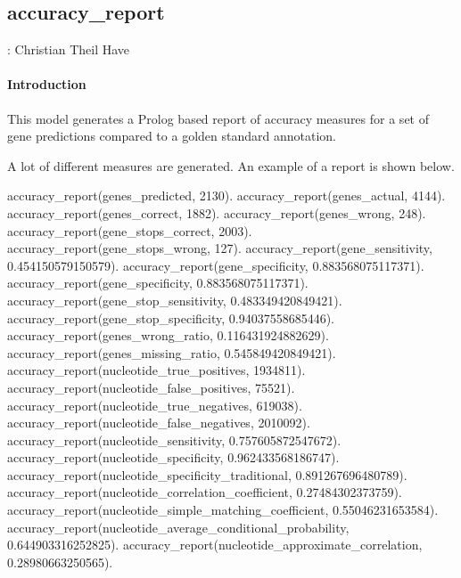 


\subsection{accuracy_report}

\label{sec:accuracyreport}

\begin{tags}
: Christian Theil Have
\end{tags}

\paragraph{Introduction}

This model generates a Prolog based report of accuracy measures
for a set of gene predictions compared to a golden standard annotation.

A lot of different measures are generated. An example of a report is
shown below.

\begin{code}
accuracy_report(genes_predicted, 2130).
accuracy_report(genes_actual, 4144).
accuracy_report(genes_correct, 1882).
accuracy_report(genes_wrong, 248).
accuracy_report(gene_stops_correct, 2003).
accuracy_report(gene_stops_wrong, 127).
accuracy_report(gene_sensitivity, 0.454150579150579).
accuracy_report(gene_specificity, 0.883568075117371).
accuracy_report(gene_specificity, 0.883568075117371).
accuracy_report(gene_stop_sensitivity, 0.483349420849421).
accuracy_report(gene_stop_specificity, 0.94037558685446).
accuracy_report(genes_wrong_ratio, 0.116431924882629).
accuracy_report(genes_missing_ratio, 0.545849420849421).
accuracy_report(nucleotide_true_positives, 1934811).
accuracy_report(nucleotide_false_positives, 75521).
accuracy_report(nucleotide_true_negatives, 619038).
accuracy_report(nucleotide_false_negatives, 2010092).
accuracy_report(nucleotide_sensitivity, 0.757605872547672).
accuracy_report(nucleotide_specificity, 0.962433568186747).
accuracy_report(nucleotide_specificity_traditional, 0.891267696480789).
accuracy_report(nucleotide_correlation_coefficient, 0.27484302373759).
accuracy_report(nucleotide_simple_matching_coefficient, 0.55046231653584).
accuracy_report(nucleotide_average_conditional_probability, 0.644903316252825).
accuracy_report(nucleotide_approximate_correlation, 0.28980663250565).
\end{code}

